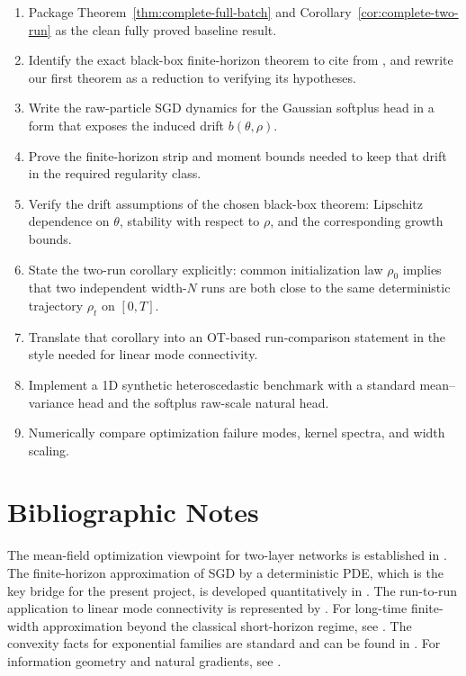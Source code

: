 \documentclass[11pt]{article}
\theoremstyle{definition}
\begin{document}
\begin{enumerate}[label=(S\arabic*)]
  \item Package Theorem~\ref{thm:complete-full-batch} and
  Corollary~\ref{cor:complete-two-run} as the clean fully proved baseline
  result.
  \item Identify the exact black-box finite-horizon theorem to cite from
  \cite{MeiMisiakiewiczMontanari2019,SirignanoSpiliopoulos2020}, and rewrite our
  first theorem as a reduction to verifying its hypotheses.
  \item Write the raw-particle SGD dynamics for the Gaussian softplus head in a
  form that exposes the induced drift $b(\theta,\rho)$.
  \item Prove the finite-horizon strip and moment bounds needed to keep that
  drift in the required regularity class.
  \item Verify the drift assumptions of the chosen black-box theorem:
  Lipschitz dependence on $\theta$, stability with respect to $\rho$, and the
  corresponding growth bounds.
  \item State the two-run corollary explicitly: common initialization law
  $\rho_0$ implies that two independent width-$N$ runs are both close to the
  same deterministic trajectory $\rho_t$ on $[0,T]$.
  \item Translate that corollary into an OT-based run-comparison statement in
  the style needed for linear mode connectivity.
  \item Implement a 1D synthetic heteroscedastic benchmark with a standard
  mean--variance head and the softplus raw-scale natural head.
  \item Numerically compare optimization failure modes, kernel spectra, and
  width scaling.
\end{enumerate}

\section*{Bibliographic Notes}

The mean-field optimization viewpoint for two-layer networks is established in
\cite{ChizatBach2018,MeiMontanariNguyen2018,RotskoffVandenEijnden2018}. The
finite-horizon approximation of SGD by a deterministic PDE, which is the key
bridge for the present project, is developed quantitatively in
\cite{MeiMisiakiewiczMontanari2019,SirignanoSpiliopoulos2020}. The run-to-run
application to linear mode connectivity is represented by \cite{FerbachEtAl2024}.
For long-time finite-width approximation beyond the classical short-horizon
regime, see \cite{GlasgowWuBruna2025}. The convexity facts for exponential
families are standard and can be found in \cite{WainwrightJordan2008}. For
information geometry and natural gradients, see \cite{Amari1998}.
\end{document}
